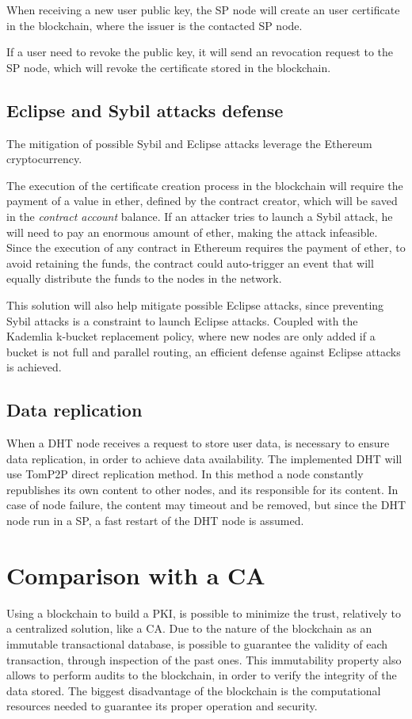 When receiving a new user public key, the SP node will create an user certificate in the blockchain, where the issuer is the contacted SP node.

If a user need to revoke the public key, it will send an revocation request to the SP node, which will revoke the certificate stored in the blockchain.

\subsection{Eclipse and Sybil attacks defense}
The mitigation of possible Sybil and Eclipse attacks leverage the Ethereum cryptocurrency.

The execution of the certificate creation process in the blockchain will require the payment of a value in ether, defined by the contract creator, which will be saved in the \textit{contract account} balance.
If an attacker tries to launch a Sybil attack, he will need to pay an enormous amount of ether, making the attack infeasible.
Since the execution of any contract in Ethereum requires the payment of ether, to avoid retaining the funds, the contract could auto-trigger an event that will equally distribute the funds to the nodes in the network.

This solution will also help mitigate possible Eclipse attacks, since preventing Sybil attacks is a constraint to launch Eclipse attacks.
Coupled with the Kademlia k-bucket replacement policy, where new nodes are only added if a bucket is not full and parallel routing, an efficient defense against Eclipse attacks is achieved.

\subsection{Data replication}
When a DHT node receives a request to store user data, is necessary to ensure data replication, in order to achieve data availability.
The implemented DHT will use TomP2P direct replication method. In this method a node constantly republishes its own content to other nodes, and its responsible for its content.
In case of node failure, the content may timeout and be removed, but since the DHT node run in a SP, a fast restart of the DHT node is assumed.

\section{Comparison with a CA}
Using a blockchain to build a PKI, is possible to minimize the trust, relatively to a centralized solution, like a CA.
Due to the nature of the blockchain as an immutable transactional database, is possible to guarantee the validity of each transaction, through inspection of the past ones.
This immutability property also allows to perform audits to the blockchain, in order to verify the integrity of the data stored.
The biggest disadvantage of the blockchain is the computational resources needed to guarantee its proper operation and security.
